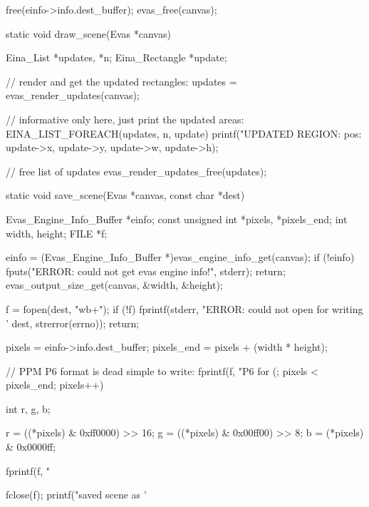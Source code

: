 \begin{DoxyCodeInclude}
{   free(einfo->info.dest_buffer);
   evas_free(canvas);
}

static void draw_scene(Evas *canvas)
{
   Eina_List *updates, *n;
   Eina_Rectangle *update;

   // render and get the updated rectangles:
   updates = evas_render_updates(canvas);

   // informative only here, just print the updated areas:
   EINA_LIST_FOREACH(updates, n, update)
     printf("UPDATED REGION: pos: %
            update->x, update->y, update->w, update->h);

   // free list of updates
   evas_render_updates_free(updates);
}

static void save_scene(Evas *canvas, const char *dest)
{
   Evas_Engine_Info_Buffer *einfo;
   const unsigned int *pixels, *pixels_end;
   int width, height;
   FILE *f;

   einfo = (Evas_Engine_Info_Buffer *)evas_engine_info_get(canvas);
   if (!einfo)
     {
        fputs("ERROR: could not get evas engine info!\n", stderr);
        return;
     }
   evas_output_size_get(canvas, &width, &height);

   f = fopen(dest, "wb+");
   if (!f)
     {
        fprintf(stderr, "ERROR: could not open for writing '%
                dest, strerror(errno));
        return;
     }

   pixels = einfo->info.dest_buffer;
   pixels_end = pixels + (width * height);

   // PPM P6 format is dead simple to write:
   fprintf(f, "P6\n%
   for (; pixels < pixels_end; pixels++)
     {
        int r, g, b;

        r = ((*pixels) & 0xff0000) >> 16;
        g = ((*pixels) & 0x00ff00) >> 8;
        b = (*pixels) & 0x0000ff;

        fprintf(f, "%
     }

   fclose(f);
   printf("saved scene as '%
}
\end{DoxyCodeInclude}


